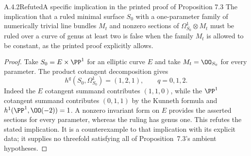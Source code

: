 \begin{statement}{A.4.2}{Refuted}{A specific implication in the printed proof of Proposition 7.3}
The implication that a ruled minimal surface $S_0$ with a one-parameter family of numerically trivial line bundles $M_t$ and nonzero sections of $\Omega^1_{S_0}\otimes M_t$ must be ruled over a curve of genus at least two is false when the family $M_t$ is allowed to be constant, as the printed proof explicitly allows.
\end{statement}
\begin{proof}
Take $S_0=E\times\PP^1$ for an elliptic curve $E$ and take $M_t=\OO_{S_0}$ for every parameter. The product cotangent decomposition gives
\[
 h^q(S_0,\Omega^1_{S_0})=(1,2,1),\qquad q=0,1,2.
\]
Indeed the $E$ cotangent summand contributes $(1,1,0)$, while the $\PP^1$ cotangent summand contributes $(0,1,1)$ by the Kunneth formula and $h^1(\PP^1,\OO(-2))=1$. A nonzero invariant form on $E$ provides the asserted sections for every parameter, whereas the ruling has genus one. This refutes the stated implication. It is a counterexample to that implication with its explicit data; it supplies no threefold satisfying all of Proposition~7.3's ambient hypotheses.
\end{proof}



